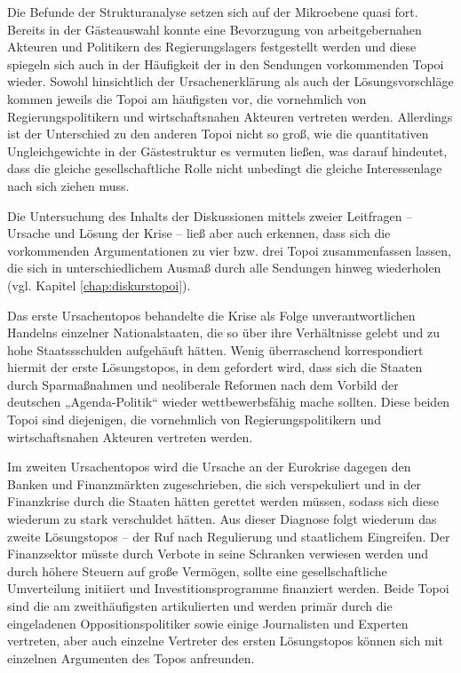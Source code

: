 Die Befunde der Strukturanalyse setzen sich auf der Mikroebene quasi fort. Bereits in der Gästeauswahl konnte eine Bevorzugung von arbeitgebernahen Akteuren und Politikern des Regierungslagers festgestellt werden und diese spiegeln sich auch in der Häufigkeit der in den Sendungen vorkommenden Topoi wieder. Sowohl hinsichtlich der Ursachenerklärung als auch der Lösungsvorschläge kommen jeweils die Topoi am häufigsten vor, die vornehmlich von Regierungspolitikern und wirtschaftsnahen Akteuren vertreten werden. Allerdings ist der Unterschied zu den anderen Topoi nicht so groß, wie die quantitativen Ungleichgewichte in der Gästestruktur es vermuten ließen, was darauf hindeutet, dass die gleiche gesellschaftliche Rolle nicht unbedingt die gleiche Interessenlage nach sich ziehen muss.

Die Untersuchung des Inhalts der Diskussionen mittels zweier Leitfragen – Ursache und Lösung der Krise – ließ aber auch erkennen, dass sich die vorkommenden Argumentationen zu vier bzw. drei Topoi zusammenfassen lassen, die sich in unterschiedlichem Ausmaß durch alle Sendungen hinweg wiederholen (vgl. Kapitel \vref{chap:diskurstopoi}).

Das erste Ursachentopos behandelte die Krise als Folge unverantwortlichen Handelns einzelner Nationalstaaten, die so über ihre Verhältnisse gelebt und zu hohe Staatssschulden aufgehäuft hätten. Wenig überraschend korrespondiert hiermit der erste Lösungstopos, in dem gefordert wird, dass sich die Staaten durch Sparmaßnahmen und neoliberale Reformen nach dem Vorbild der deutschen „Agenda-Politik“ wieder wettbewerbsfähig mache sollten. Diese beiden Topoi sind diejenigen, die vornehmlich von Regierungspolitikern und wirtschaftsnahen Akteuren vertreten werden.

Im zweiten Ursachentopos wird die Ursache an der Eurokrise dagegen den Banken und Finanzmärkten zugeschrieben, die sich verspekuliert und in der Finanzkrise durch die Staaten hätten gerettet werden müssen, sodass sich diese wiederum zu stark verschuldet hätten. Aus dieser Diagnose folgt wiederum das zweite Lösungstopos – der Ruf nach Regulierung und staatlichem Eingreifen. Der Finanzsektor müsste durch Verbote in seine Schranken verwiesen werden und durch höhere Steuern auf große Vermögen, sollte eine gesellschaftliche Umverteilung initiiert und Investitionsprogramme finanziert werden. Beide Topoi sind die am zweithäufigsten artikulierten und werden primär durch die eingeladenen Oppositionspolitiker sowie einige Journalisten und Experten vertreten, aber auch einzelne Vertreter des ersten Lösungstopos können sich mit einzelnen Argumenten des Topos anfreunden.

